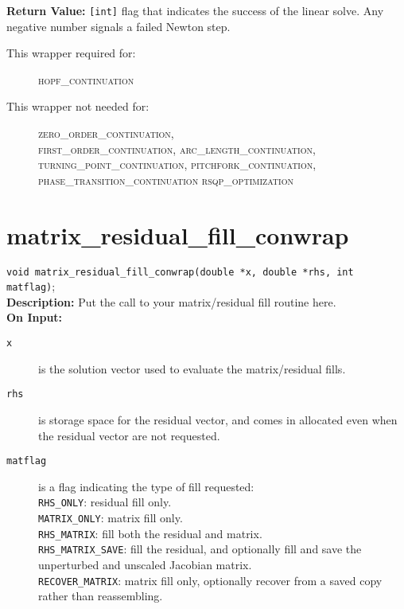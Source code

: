 {\bf Return Value:} \texttt{[int]} flag that indicates the success of the linear solve. Any negative number signals a failed Newton step.

\begin{description}
\item[This wrapper required for:] 
\textsc{hopf\_continuation}
\item[This wrapper not needed for:]
\textsc{zero\_order\_continuation, \\ first\_order\_continuation, arc\_length\_continuation, \\ 
turning\_point\_continuation, pitchfork\_continuation, \\ 
phase\_transition\_continuation rsqp\_optimization}
\end{description}

\section{matrix\_residual\_fill\_conwrap}
\texttt{void matrix\_residual\_fill\_conwrap(double *x, double *rhs, int matflag)}; \\

{\bf Description:}  Put the call to your matrix/residual fill routine here.\\

{\bf On Input:}
\begin{description}
\item[\texttt{x}] is the solution vector used to evaluate the matrix/residual fills.
\item[\texttt{rhs}] is storage space for the residual vector, and comes in allocated even when the residual vector are not requested.
\item[\texttt{matflag}] is a flag indicating the type of fill requested:\\
\texttt{RHS\_ONLY}: residual fill only.\\
\texttt{MATRIX\_ONLY}: matrix fill only.\\
\texttt{RHS\_MATRIX}: fill both the residual and matrix.\\
\texttt{RHS\_MATRIX\_SAVE}: fill the residual, and optionally fill and save
the unperturbed and unscaled Jacobian matrix.\\
\texttt{RECOVER\_MATRIX}: matrix fill only, optionally recover from a saved copy rather than reassembling.\\
\end{description}

